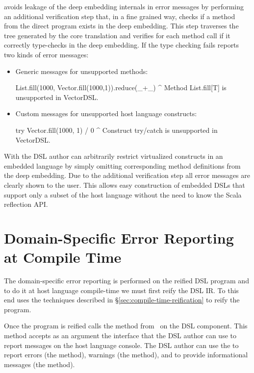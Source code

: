 \yy avoids leakage of the deep embedding internals in error messages by performing an
additional verification step that, in a fine grained way, checks if a method
from the direct program exists in the deep embedding. This step traverses the
tree generated by the core translation and verifies for each method call if it
correctly type-checks in the deep embedding. If the type checking fails \yy
reports two kinds of error messages:

\begin{itemize}
\item Generic messages for unsupported methods:\begin{lstparagraph}
List.fill(1000, Vector.fill(1000,1)).reduce(_+_)
^
Method List.fill[T] is unsupported in VectorDSL.
\end{lstparagraph}

\item Custom messages for unsupported host language constructs:\begin{lstparagraph}
try Vector.fill(1000, 1) / 0
^
Construct try/catch is unsupported in VectorDSL.
\end{lstparagraph}
\end{itemize}
%
With \yy the DSL author can arbitrarily restrict virtualized constructs in an
embedded language by simply omitting corresponding method definitions from the
deep embedding. Due to the additional verification step all error messages are
clearly shown to the user. This allows easy construction of embedded DSLs that
support only a subset of the host language without the need to know the Scala
reflection API.

\section{Domain-Specific Error Reporting at Compile Time}
\label{sec:domain-specific-error-reporting}

The domain-specific error reporting is performed on the reified DSL program and to do it
at host language compile-time we must first reify the DSL IR. To this end \yy uses
the techniques described in \S \ref{sec:compile-time-reification} to reify the program.


Once the program is reified \yy calls the  method from~ on the DSL component. This method accepts as an argument the  interface that the  DSL
author can use to report messages on the host language console. The DSL author can use
the  to report errors (the  method), warnings (the  method),
and to provide informational messages (the  method).


